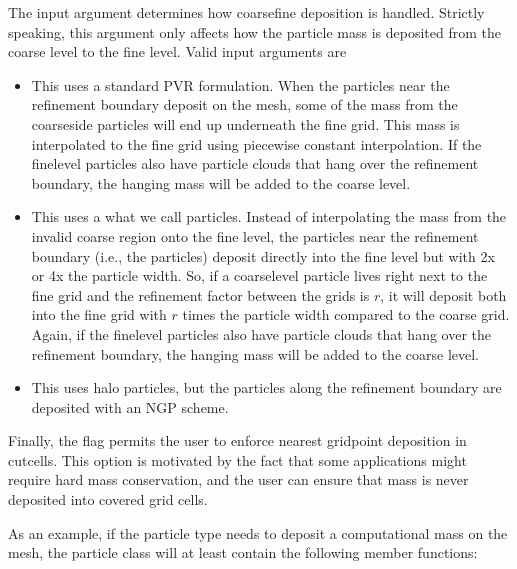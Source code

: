 \documentclass[letterpaper,10pt,english]{sphinxmanual}
\begin{document}
The input argument  determines how coarse\sphinxhyphen{}fine deposition is handled.
Strictly speaking, this argument only affects how the particle mass is deposited from the coarse level to the fine level.
Valid input arguments are
\begin{itemize}
\item {} 
 This uses a standard PVR formulation.
When the particles near the refinement boundary deposit on the mesh, some of the mass from the coarse\sphinxhyphen{}side particles will end up underneath the fine grid.
This mass is interpolated to the fine grid using piecewise constant interpolation.
If the fine\sphinxhyphen{}level particles also have particle clouds that hang over the refinement boundary, the hanging mass will be added to the coarse level.

\item {} 
 This uses a what we call  particles.
Instead of interpolating the mass from the invalid coarse region onto the fine level, the particles near the refinement boundary (i.e., the  particles) deposit directly into the fine level but with 2x or 4x the particle width.
So, if a coarse\sphinxhyphen{}level particle lives right next to the fine grid and the refinement factor between the grids is \(r\), it will deposit both into the fine grid with \(r\) times the particle width compared to the coarse grid.
Again, if the fine\sphinxhyphen{}level particles also have particle clouds that hang over the refinement boundary, the hanging mass will be added to the coarse level.

\item {} 
 This uses halo particles, but the particles along the refinement boundary are deposited with an NGP scheme.

\end{itemize}

Finally, the flag  permits the user to enforce nearest grid\sphinxhyphen{}point deposition in cut\sphinxhyphen{}cells.
This option is motivated by the fact that some applications might require hard mass conservation, and the user can ensure that mass is never deposited into covered grid cells.

As an example, if the particle type  needs to deposit a computational mass on the mesh, the particle class will at least contain the following member functions:
\end{document}
